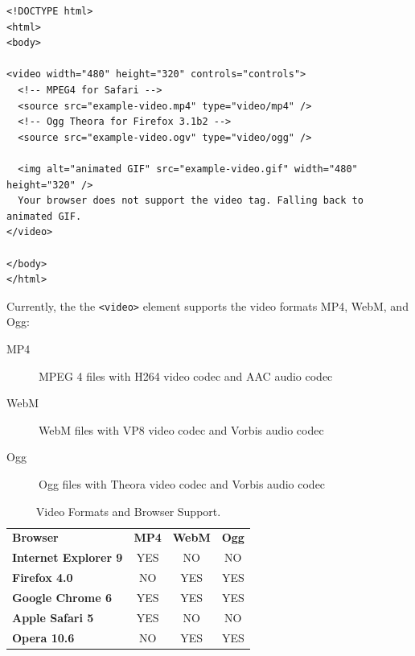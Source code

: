 \begin{verbatim}
<!DOCTYPE html>
<html>
<body>

<video width="480" height="320" controls="controls">
  <!-- MPEG4 for Safari -->
  <source src="example-video.mp4" type="video/mp4" /> 
  <!-- Ogg Theora for Firefox 3.1b2 --> 
  <source src="example-video.ogv" type="video/ogg" /> 

  <img alt="animated GIF" src="example-video.gif" width="480" height="320" />
  Your browser does not support the video tag. Falling back to animated GIF.
</video>

</body>
</html>
\end{verbatim}%
%
Currently,  the the  \texttt{{\textless}video{\textgreater}}  element supports
the video formats MP4, WebM, and Ogg:
\begin{description}
\item[MP4] MPEG 4 files with H264 video codec and AAC audio codec
\item[WebM] WebM files with VP8 video codec and Vorbis audio codec
\item[Ogg] Ogg files with Theora video codec and Vorbis audio codec
\end{description}

\begin{table}[htb]
\centering
\begin{minipage}[h]{0.9\textwidth}\caption{Video Formats and Browser Support.}
\label{tab:web_browser_video_formats}
\end{minipage}
\par\medskip\noindent
\begin{minipage}[h]{0.9\textwidth}
\centering
\begin{tabular}{lccc}
  \toprule
  {\bf Browser}             & {\bf MP4} & {\bf WebM} & {\bf Ogg} \\ \otoprule
  {\bf Internet Explorer 9} &	YES     &    NO      & NO   \\
  {\bf Firefox 4.0}         &   NO      &    YES     & YES  \\
  {\bf Google Chrome 6}     &   YES     &    YES     & YES  \\
  {\bf Apple Safari 5}      &   YES     &    NO      & NO   \\
  {\bf Opera 10.6}          &   NO      &    YES     & YES  \\
  \bottomrule
\end{tabular} 
\end{minipage}
\end{table}
